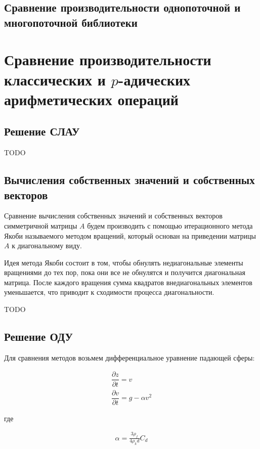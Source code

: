 \documentclass[master, och, diploma, times]{sty/SCWorks}
\theoremstyle{plain}
\theoremstyle{definition}
\begin{document}
\subsection{Сравнение производительности однопоточной и многопоточной библиотеки} 


\section{Сравнение производительности классических и $p$-адических арифметических операций}
\subsection{Решение СЛАУ}
TODO

\subsection{Вычисления собственных значений и собственных векторов}
Сравнение вычисления собственных значений и собственных векторов симметричной матрицы $A$ будем производить с помощью итерационного метода Якоби называемого методом вращений, который основан на приведении матрицы $A$ к диагональному виду.

Идея метода Якоби состоит в том, чтобы обнулять недиагональные элементы вращениями до тех пор, пока они все не обнулятся и получится диагональная матрица. После каждого вращения сумма квадратов внедиагональных элементов уменьшается, что приводит к сходимости процесса диагональности. 

TODO

\subsection{Решение ОДУ}
Для сравнения методов возьмем дифференциальное уравнение падающей сферы:

\begin{equation}
\begin{aligned}
\dfrac{\partial z}{ \partial t} = v \\
\dfrac{\partial v}{ \partial t} = g - \alpha v^2
\end{aligned}
\end{equation}

\noindent где

\begin{equation}
\begin{aligned}
\alpha = \frac{3\rho_f}{4\rho_k d}C_d
\end{aligned}
\end{equation}
\end{document}
